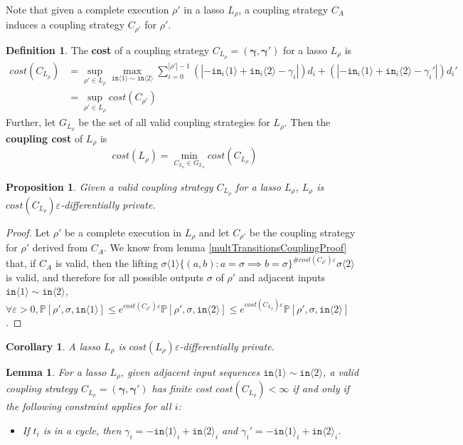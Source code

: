 \documentclass[12pt]{article}
\newcommand{\PP}{\mathbb{P}}
\newcommand{\brangle}[1]{\langle #1 \rangle}
\newtheorem{lemma}[thm]{Lemma}
\newtheorem{prop}[thm]{Proposition}
\newtheorem{cor}[thm]{Corollary}
\theoremstyle{definition}
\newtheorem{defn}[thm]{Definition}
\begin{document}
Note that given a complete execution $\rho'$ in a lasso $L_\rho$, a coupling strategy $C_A$ induces a coupling strategy $C_{\rho'}$ for $\rho'$.

\begin{defn}
    The \textbf{cost} of a coupling strategy $C_{L_\rho} = (\bm{\gamma}, \bm{\gamma}')$ for a lasso $L_\rho$ is \begin{align*}
    cost(C_{L_\rho}) &= \sup_{\rho'\in L_{\rho}}\max_{\texttt{in}\brangle{1}\sim \texttt{in}\brangle{2}} \sum_{i=0}^{|\rho'|-1}(|-\texttt{in}_i\brangle{1}+\texttt{in}_i\brangle{2}-\gamma_i|)d_i+(|-\texttt{in}_i\brangle{1}+\texttt{in}_i\brangle{2}-\gamma_i'|)d_i'\\
    &=\sup_{\rho'\in L_\rho}cost(C_{\rho'})
\end{align*}
    Further, let $G_{L_\rho}$ be the set of all valid coupling strategies for $L_\rho$. Then the \textbf{coupling cost} of $L_\rho$ is \[
        cost(L_\rho) = \min_{C_{L_\rho}\in G_{L_\rho}}cost(C_{L_\rho})
    \]
\end{defn}

\begin{prop}
    Given a valid coupling strategy $C_{L_\rho}$ for a lasso $L_\rho$, $L_\rho$ is $cost(C_{L_\rho})\varepsilon$-differentially private. 
\end{prop}
\begin{proof}
    Let $\rho'$ be a complete execution in $L_\rho$ and let $C_{\rho'}$ be the coupling strategy for $\rho'$ derived from $C_A$. We know from lemma \ref{multTransitionsCouplingProof} that, if $C_A$ is valid, then the lifting $\sigma\brangle{1}\{(a, b): a=\sigma\implies b=\sigma\}^{\#cost(C_{\rho'})\varepsilon}\sigma\brangle{2}$ is valid, 
    and therefore for all possible outputs $\sigma$ of $\rho'$ and adjacent inputs $\texttt{in}\brangle{1}\sim\texttt{in}\brangle{2}$, $\forall \varepsilon>0, \PP[\rho', \sigma, \texttt{in}\brangle{1}]\leq e^{cost(C_{\rho'})\varepsilon}\PP[\rho', \sigma, \texttt{in}\brangle{2}]\leq e^{cost(C_{L_\rho})\varepsilon}\PP[\rho', \sigma, \texttt{in}\brangle{2}]$.
\end{proof}
\begin{cor}
    A lasso $L_\rho$ is $cost(L_\rho)\varepsilon$-differentially private. 
\end{cor}



\begin{lemma}\label{finiteCostConstraintLemma}
    For a lasso $L_\rho$, given adjacent input sequences $\texttt{in}\brangle{1}\sim \texttt{in}\brangle{2}$, a valid coupling strategy $C_{L_\rho} = (\mathbf{\gamma}, \mathbf{\gamma}')$ has finite cost $cost(C_{L_\rho})<\infty$ if and only if the following constraint applies for all $i$:
    \begin{itemize}
        \item If $t_i$ is in a cycle, then $\gamma_i = -\texttt{in}\brangle{1}_i+\texttt{in}\brangle{2}_i$ and $\gamma_i' = -\texttt{in}\brangle{1}_i+\texttt{in}\brangle{2}_i$.
    \end{itemize}
\end{lemma}
\end{document}
